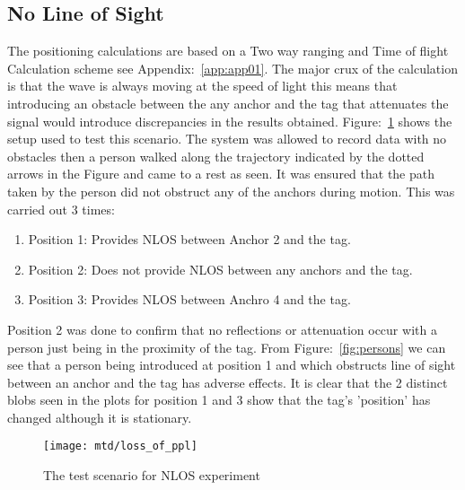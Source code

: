 \subsection{No Line of Sight}\label{subsec:no-line-of-sight}
The positioning calculations are based on a Two way ranging and Time of flight Calculation scheme see Appendix:~\ref{app:app01}.
The major crux of the calculation is that the wave is always moving at the speed of light this means that introducing an obstacle between the any anchor and the tag that attenuates the signal would introduce discrepancies in the results obtained.
Figure:~\ref{fig:nlos} shows the setup used to test this scenario.
The system was allowed to record data with no obstacles then a person walked along the trajectory indicated by the dotted arrows in the Figure and came to a rest as seen.
It was ensured that the path taken by the person did not obstruct any of the anchors during motion.
This was carried out 3 times:
\begin{enumerate}
    \item Position 1: Provides NLOS between Anchor 2 and the tag.
    \item Position 2: Does not provide NLOS between any anchors and the tag.
    \item Position 3: Provides NLOS between Anchro 4 and the tag.
\end{enumerate}
Position 2 was done to confirm that no reflections or attenuation occur with a person just being in the proximity of the tag.
From Figure:~\ref{fig:persons} we can see that a person being introduced at position 1 and which obstructs line of sight between an anchor and the tag has adverse effects.
It is clear that the 2 distinct blobs seen in the plots for position 1 and 3 show that the tag's 'position' has changed although it is stationary.

\begin{figure}[h!]
    \centering
    \texttt{[image: mtd/loss\_of\_ppl]}
    \caption{The test scenario for NLOS experiment}
    \label{fig:nlos}
\end{figure}

